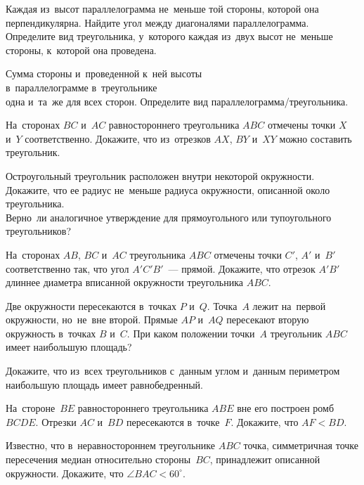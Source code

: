 


\begin{problems}

\item
\subproblem
Каждая из~высот параллелограмма не~меньше той стороны, которой она
перпендикулярна.
Найдите угол между диагоналями параллелограмма.
\\
\subproblem
Определите вид треугольника, у~которого каждая из~двух высот не~меньше стороны,
к~которой она проведена.

\item
Сумма стороны и~проведенной к~ней высоты
\\
\subproblem в~параллелограмме
\quad
\subproblem в~треугольнике
\\
одна и~та~же для всех сторон.
Определите вид параллелограмма/треугольника.

\item
На~сторонах $BC$ и~$AC$ равностороннего треугольника $ABC$ отмечены
точки $X$ и~$Y$ соответственно.
Докажите, что из~отрезков $AX$, $BY$ и~$XY$ можно составить треугольник.

\item
\subproblem
Остроугольный треугольник расположен внутри некоторой окружности.
Докажите, что ее радиус не~меньше радиуса окружности, описанной около
треугольника.
\\
\subproblem
Верно~ли аналогичное утверждение для прямоугольного или тупоугольного
треугольников?

\item
На~сторонах $AB$, $BC$ и~$AC$ треугольника $ABC$ отмечены
точки $C'$, $A'$ и~$B'$ соответственно так, что угол $A'C'B'$~--- прямой.
Докажите, что отрезок $A'B'$ длиннее диаметра вписанной окружности
треугольника $ABC$.

\item
Две окружности пересекаются в~точках $P$ и~$Q$.
Точка~$A$ лежит на~первой окружности, но~не~вне второй.
Прямые $AP$ и~$AQ$ пересекают вторую окружность в~точках $B$ и~$C$.
При каком положении точки~$A$ треугольник $ABC$ имеет наибольшую площадь?

\item
Докажите, что из~всех треугольников с~данным углом и~данным периметром
наибольшую площадь имеет равнобедренный.

\item
На~стороне~$BE$ равностороннего треугольника $ABE$ вне его построен
ромб $BCDE$.
Отрезки $AC$ и~$BD$ пересекаются в~точке~$F$.
Докажите, что $AF < BD$.

\item
Известно, что в~неравностороннем треугольнике $ABC$ точка, симметричная точке
пересечения медиан относительно стороны~$BC$, принадлежит описанной окружности.
Докажите, что $\angle BAC < 60^{\circ}$.

\end{problems}

